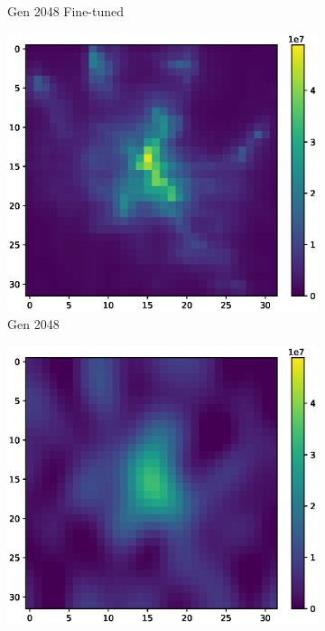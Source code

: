 \begin{figure}
\begin{subfigure}[b]{0.32\textwidth}
        \caption{Gen 2048 Fine-tuned}
    \end{subfigure}
    \begin{subfigure}[b]{0.32\textwidth}
        \includegraphics[width=\textwidth]{figures/06_results/gaussian_plume_example/munich/gen_2048_20_db.eps}
        \caption{Gen 2048}
    \end{subfigure}
    \begin{subfigure}[b]{0.32\textwidth}
        \includegraphics[width=\textwidth]{figures/06_results/gaussian_plume_example/munich/bp_dct_snr_20_db.eps}

\end{subfigure}
\end{figure}
